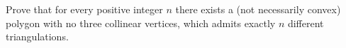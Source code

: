 Prove that for every positive integer $n$ there exists a (not necessarily convex) polygon with no three collinear vertices, which admits exactly $n$ different triangulations.